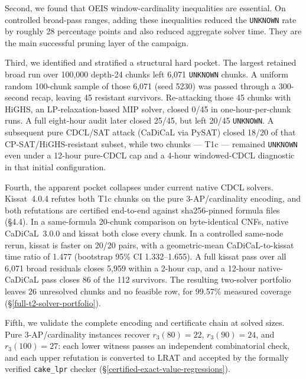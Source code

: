 Second, we found that OEIS window-cardinality inequalities are essential. On
controlled broad-pass ranges, adding these inequalities reduced the \texttt{UNKNOWN}
rate by roughly 28 percentage points and also reduced aggregate solver time.
They are the main successful pruning layer of the campaign.

Third, we identified and stratified a structural hard pocket. The
largest retained broad run over 100,000 depth-24 chunks left 6,071
\texttt{UNKNOWN} chunks. A uniform random 100-chunk sample of those 6,071
(seed 5230)
was passed through a 300-second recap, leaving 45 resistant survivors.
Re-attacking those 45 chunks with HiGHS, an
LP-relaxation-based MIP solver, closed 0/45 in one-hour-per-chunk runs.
A full eight-hour audit later closed 25/45, but left 20/45
\texttt{UNKNOWN}. A subsequent pure CDCL/SAT attack (CaDiCaL via PySAT)
closed 18/20 of that CP-SAT/HiGHS-resistant subset,
while two chunks --- T1c --- remained \texttt{UNKNOWN} even under a 12-hour
pure-CDCL cap and a 4-hour windowed-CDCL diagnostic in that initial
configuration.

Fourth, the apparent pocket collapses under current native CDCL solvers.
Kissat~4.0.4 refutes both T1c chunks on the pure 3-AP/cardinality encoding,
and both refutations are certified end-to-end against sha256-pinned formula
files (§4.4). In a same-formula 20-chunk comparison on byte-identical CNFs,
native CaDiCaL~3.0.0 and kissat both close every chunk. In a controlled
same-node rerun, kissat is faster on 20/20 pairs, with a geometric-mean
CaDiCaL-to-kissat time ratio of 1.477 (bootstrap 95\% CI 1.332--1.655).
A full kissat pass over all 6,071 broad residuals closes 5,959
within a 2-hour cap, and a 12-hour native-CaDiCaL pass closes 86 of the 112
survivors. The resulting two-solver portfolio leaves 26 unresolved chunks
and no feasible row, for 99.57\% measured coverage
(§\ref{full-t2-solver-portfolio}).

Fifth, we validate the complete encoding and certificate chain at solved
sizes. Pure 3-AP/cardinality instances recover
$r_3(80)=22$, $r_3(90)=24$, and $r_3(100)=27$: each lower witness passes an
independent combinatorial check, and each upper refutation is converted to
LRAT and accepted by the formally verified \texttt{cake\_lpr} checker
(§\ref{certified-exact-value-regressions}).

